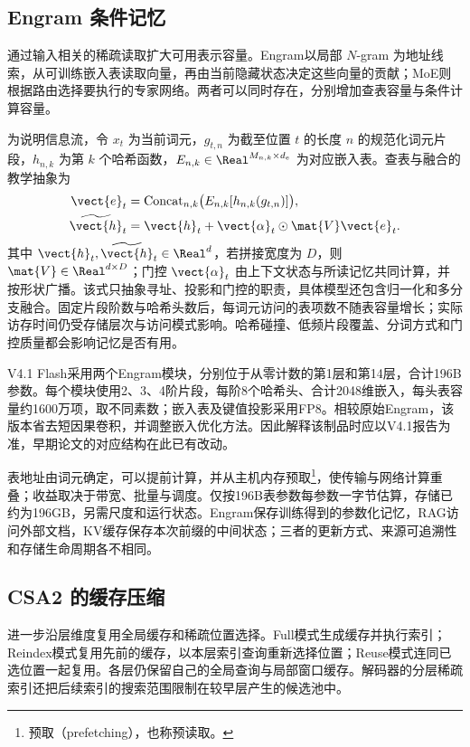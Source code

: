 \documentclass[../textbook.tex]{subfiles}
\begin{document}
\subsection{Engram 条件记忆}
通过输入相关的稀疏读取扩大可用表示容量。Engram以局部 $N$-gram 为地址线索，从可训练嵌入表读取向量，再由当前隐藏状态决定这些向量的贡献；MoE则根据路由选择要执行的专家网络。两者可以同时存在，分别增加查表容量与条件计算容量\cite{cheng2026engram}。

为说明信息流，令 $x_t$ 为当前词元，$g_{t,n}$ 为截至位置 $t$ 的长度 $n$ 的规范化词元片段，$h_{n,k}$ 为第 $k$ 个哈希函数，$E_{n,k}\in\Real^{M_{n,k}\times d_e}$ 为对应嵌入表。查表与融合的教学抽象为
\begin{equation}
 \begin{aligned}
  \vect{e}_t &= \operatorname{Concat}_{n,k}\bigl(E_{n,k}[h_{n,k}(g_{t,n})]\bigr), \\
  \widetilde{\vect{h}}_t &= \vect{h}_t+\vect{\alpha}_t\odot \mat{V} \vect{e}_t.
 \end{aligned}
\end{equation}
其中 $\vect{h}_t,\widetilde{\vect{h}}_t\in\Real^d$，若拼接宽度为 $D$，则 $\mat{V}\in\Real^{d\times D}$；门控 $\vect{\alpha}_t$ 由上下文状态与所读记忆共同计算，并按形状广播。该式只抽象寻址、投影和门控的职责，具体模型还包含归一化和多分支融合。固定片段阶数与哈希头数后，每词元访问的表项数不随表容量增长；实际访存时间仍受存储层次与访问模式影响。哈希碰撞、低频片段覆盖、分词方式和门控质量都会影响记忆是否有用。

V4.1 Flash采用两个Engram模块，分别位于从零计数的第1层和第14层，合计196B参数。每个模块使用2、3、4阶片段，每阶8个哈希头、合计2048维嵌入，每头表容量约1600万项，取不同素数；嵌入表及键值投影采用FP8。相较原始Engram，该版本省去短因果卷积，并调整嵌入优化方法。因此解释该制品时应以V4.1报告为准，早期论文的对应结构在此已有改动\cite{deepseek2026v41flash}。

表地址由词元确定，可以提前计算，并从主机内存预取\footnote{预取（prefetching），也称预读取。}，使传输与网络计算重叠；收益取决于带宽、批量与调度。仅按196B表参数每参数一字节估算，存储已约为196GB，另需尺度和运行状态。Engram保存训练得到的参数化记忆，RAG访问外部文档，KV缓存保存本次前缀的中间状态；三者的更新方式、来源可追溯性和存储生命周期各不相同。

\subsection{CSA2 的缓存压缩}
进一步沿层维度复用全局缓存和稀疏位置选择。Full模式生成缓存并执行索引；Reindex模式复用先前的缓存，以本层索引查询重新选择位置；Reuse模式连同已选位置一起复用。各层仍保留自己的全局查询与局部窗口缓存。解码器的分层稀疏索引还把后续索引的搜索范围限制在较早层产生的候选池中\cite{deepseek2026v41flash}。
\end{document}
